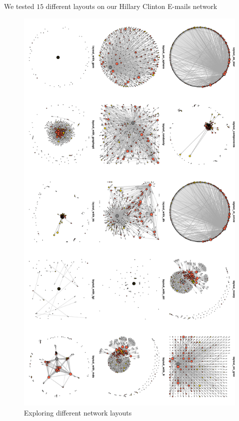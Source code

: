 We tested $15$ different layouts on our Hillary Clinton E-mails network
\begin{figure}[ht]
\centering
\includegraphics[width=.5\textwidth]{zoe/report_explore_layout}
\caption{Exploring different network layouts}
\label{fig:trylayout}
\end{figure}
